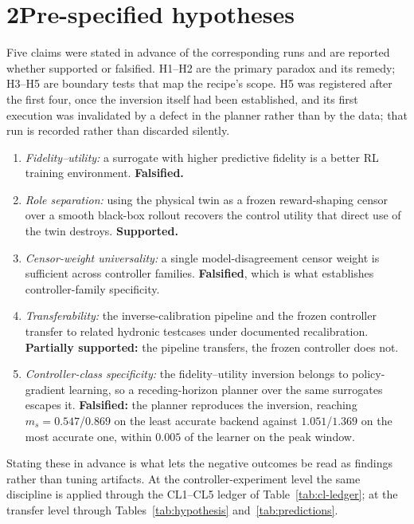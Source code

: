 \documentclass[11pt,a4paper]{article}
\begin{document}
\section*{2\quad Pre-specified hypotheses}
Five claims were stated in advance of the corresponding runs and are reported whether supported or
falsified. H1--H2 are the primary paradox and its remedy; H3--H5 are boundary tests that map the
recipe's scope. H5 was registered after the first four, once the inversion itself had been
established, and its first execution was invalidated by a defect in the planner rather than by the
data; that run is recorded rather than discarded silently.
\begin{enumerate}[label=\textbf{H\arabic*.},leftmargin=2.8em]
\item \emph{Fidelity--utility:} a surrogate with higher predictive fidelity is a better RL training environment. \textbf{Falsified.}
\item \emph{Role separation:} using the physical twin as a frozen reward-shaping censor over a smooth black-box rollout recovers the control utility that direct use of the twin destroys. \textbf{Supported.}
\item \emph{Censor-weight universality:} a single model-disagreement censor weight is sufficient across controller families. \textbf{Falsified}, which is what establishes controller-family specificity.
\item \emph{Transferability:} the inverse-calibration pipeline and the frozen controller transfer to related hydronic testcases under documented recalibration. \textbf{Partially supported:} the pipeline transfers, the frozen controller does not.
\item \emph{Controller-class specificity:} the fidelity--utility inversion belongs to policy-gradient learning, so a receding-horizon planner over the same surrogates escapes it. \textbf{Falsified:} the planner reproduces the inversion, reaching $m_s=0.547$/$0.869$ on the least accurate backend against $1.051$/$1.369$ on the most accurate one, within $0.005$ of the learner on the peak window.
\end{enumerate}
Stating these in advance is what lets the negative outcomes be read as findings rather than tuning
artifacts. At the controller-experiment level the same discipline is applied through the CL1--CL5
ledger of Table~\ref{tab:cl-ledger}; at the transfer level through Tables~\ref{tab:hypothesis}
and~\ref{tab:predictions}.
\end{document}
